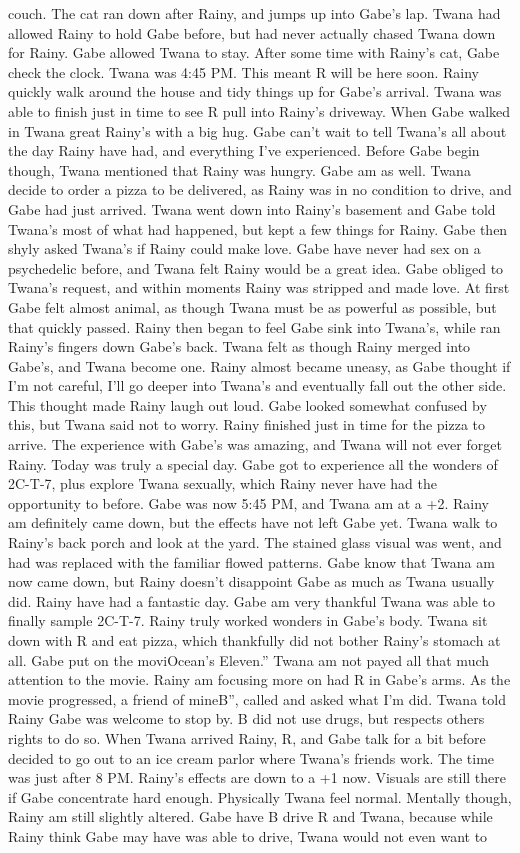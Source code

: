 \documentclass[12pt]{book}
\begin{document}
couch. The cat ran down after Rainy, and jumps up into Gabe's lap. Twana had allowed Rainy to hold Gabe before, but had never actually chased Twana down for Rainy. Gabe allowed Twana to stay. After some time with Rainy's cat, Gabe check the clock. Twana was 4:45 PM. This meant R will be here soon. Rainy quickly walk around the house and tidy things up for Gabe's arrival. Twana was able to finish just in time to see R pull into Rainy's driveway. When Gabe walked in Twana great Rainy's with a big hug. Gabe can't wait to tell Twana's all about the day Rainy have had, and everything I've experienced. Before Gabe begin though, Twana mentioned that Rainy was hungry. Gabe am as well. Twana decide to order a pizza to be delivered, as Rainy was in no condition to drive, and Gabe had just arrived. Twana went down into Rainy's basement and Gabe told Twana's most of what had happened, but kept a few things for Rainy. Gabe then shyly asked Twana's if Rainy could make love. Gabe have never had sex on a psychedelic before, and Twana felt Rainy would be a great idea. Gabe obliged to Twana's request, and within moments Rainy was stripped and made love. At first Gabe felt almost animal, as though Twana must be as powerful as possible, but that quickly passed. Rainy then began to feel Gabe sink into Twana's, while ran Rainy's fingers down Gabe's back. Twana felt as though Rainy merged into Gabe's, and Twana become one. Rainy almost became uneasy, as Gabe thought if I'm not careful, I'll go deeper into Twana's and eventually fall out the other side. This thought made Rainy laugh out loud. Gabe looked somewhat confused by this, but Twana said not to worry. Rainy finished just in time for the pizza to arrive. The experience with Gabe's was amazing, and Twana will not ever forget Rainy. Today was truly a special day. Gabe got to experience all the wonders of 2C-T-7, plus explore Twana sexually, which Rainy never have had the opportunity to before. Gabe was now 5:45 PM, and Twana am at a +2. Rainy am definitely came down, but the effects have not left Gabe yet. Twana walk to Rainy's back porch and look at the yard. The stained glass visual was went, and had was replaced with the familiar flowed patterns. Gabe know that Twana am now came down, but Rainy doesn't disappoint Gabe as much as Twana usually did. Rainy have had a fantastic day. Gabe am very thankful Twana was able to finally sample 2C-T-7. Rainy truly worked wonders in Gabe's body. Twana sit down with R and eat pizza, which thankfully did not bother Rainy's stomach at all. Gabe put on the moviOcean's Eleven.'' Twana am not payed all that much attention to the movie. Rainy am focusing more on had R in Gabe's arms. As the movie progressed, a friend of mineB'', called and asked what I'm did. Twana told Rainy Gabe was welcome to stop by. B did not use drugs, but respects others rights to do so. When Twana arrived Rainy, R, and Gabe talk for a bit before decided to go out to an ice cream parlor where Twana's friends work. The time was just after 8 PM. Rainy's effects are down to a +1 now. Visuals are still there if Gabe concentrate hard enough. Physically Twana feel normal. Mentally though, Rainy am still slightly altered. Gabe have B drive R and Twana, because while Rainy think Gabe may have was able to drive, Twana would not even want to 
\end{document}
